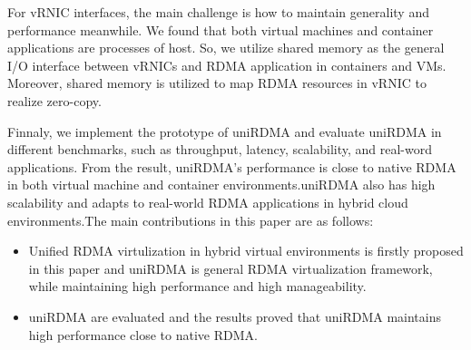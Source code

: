 For vRNIC interfaces, the main challenge is how to maintain generality and performance meanwhile. We found that both virtual machines and container applications are processes of host. So, we utilize shared memory as the general I/O interface between vRNICs and RDMA application in containers and VMs. Moreover, shared memory is utilized to map RDMA resources in vRNIC to realize zero-copy. 

Finnaly, we implement the prototype of uniRDMA and evaluate uniRDMA in different benchmarks, such as throughput, latency, scalability, and real-word applications. From the result, uniRDMA's performance is close to native RDMA in both virtual machine and container environments.uniRDMA also has high scalability and adapts to real-world RDMA applications in hybrid cloud environments.The main contributions in this paper are as follows:

\begin{itemize}
\item Unified RDMA virtulization in hybrid virtual environments is firstly proposed in this paper and uniRDMA is general RDMA virtualization framework,  while maintaining high performance and high manageability.

\item uniRDMA are evaluated and the results proved that uniRDMA maintains high performance close to native RDMA.
\end{itemize}
